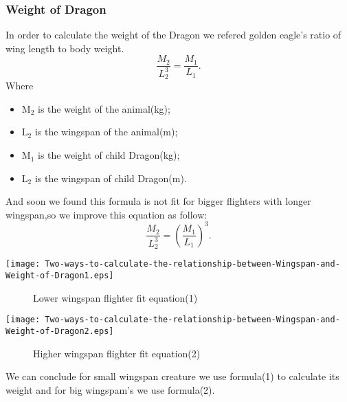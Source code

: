 \documentclass[12pt]{article}
\begin{document}
\subsubsection{Weight of Dragon}%
In order to calculate the weight of the Dragon we refered golden eagle's ratio of wing length to body weight.
\begin{equation}
	\frac{M_2}{L_2^3}=\frac{M_1}{L_1}.	%
\end{equation}
Where
\begin{itemize}
    \item M$_2$ is the weight of the animal(kg);
    \item L$_2$ is the wingspan of the animal(m);
    \item M$_1$ is the weight of child Dragon(kg);
    \item L$_2$ is the wingspan of child Dragon(m).
\end{itemize}
And soon we found this formula is not fit for bigger flighters with longer wingspan,so we improve this equation as follow:
\begin{equation}
	\frac{M_2}{L_2^3}=\left(\frac{M_1}{L_1}\right)^3.	%
\end{equation}

		\centerline{\texttt{[image: Two-ways-to-calculate-the-relationship-between-Wingspan-and-Weight-of-Dragon1.eps]}}%
\begin{figure}[!htbp]
    \small  
	 \caption{Lower wingspan flighter fit equation(1)}\label{jj}
\end{figure}


		\centerline{\texttt{[image: Two-ways-to-calculate-the-relationship-between-Wingspan-and-Weight-of-Dragon2.eps]}}%
\begin{figure}[!htbp]
    \small
    \caption{Higher wingspan flighter fit equation(2)}\label{jj}
\end{figure}
We can conclude for small wingspan creature we use formula(1) to calculate its weight and for big wingspam's we use formula(2).
\end{document}
